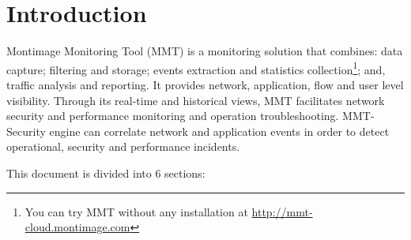 \clearpage

\section{Introduction}
\label{Introduction}

Montimage Monitoring Tool (MMT) is a monitoring solution that combines: data capture; filtering and storage; events extraction and statistics collection\footnote{You can try MMT without any installation at \url{http://mmt-cloud.montimage.com}}; and, traffic analysis and reporting. It provides network, application, flow and user level visibility. Through its real-time and historical views, MMT facilitates network security and performance monitoring and operation troubleshooting. MMT-Security engine can correlate network and application events in order to detect operational, security and performance incidents.


This document is divided into 6 sections:

